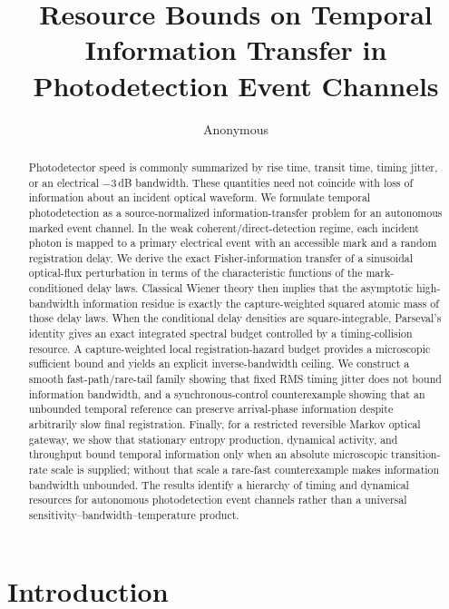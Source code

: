 \documentclass[aps,prapplied,preprint,nofootinbib]{revtex4-2}
\begin{document}
\title{Resource Bounds on Temporal Information Transfer in Photodetection Event Channels}

\author{Anonymous}

\begin{abstract}
Photodetector speed is commonly summarized by rise time, transit time, timing jitter, or an electrical $-3\,$dB bandwidth.  These quantities need not coincide with loss of information about an incident optical waveform.  We formulate temporal photodetection as a source-normalized information-transfer problem for an autonomous marked event channel.  In the weak coherent/direct-detection regime, each incident photon is mapped to a primary electrical event with an accessible mark and a random registration delay.  We derive the exact Fisher-information transfer of a sinusoidal optical-flux perturbation in terms of the characteristic functions of the mark-conditioned delay laws.  Classical Wiener theory then implies that the asymptotic high-bandwidth information residue is exactly the capture-weighted squared atomic mass of those delay laws.  When the conditional delay densities are square-integrable, Parseval's identity gives an exact integrated spectral budget controlled by a timing-collision resource.  A capture-weighted local registration-hazard budget provides a microscopic sufficient bound and yields an explicit inverse-bandwidth ceiling.  We construct a smooth fast-path/rare-tail family showing that fixed RMS timing jitter does not bound information bandwidth, and a synchronous-control counterexample showing that an unbounded temporal reference can preserve arrival-phase information despite arbitrarily slow final registration.  Finally, for a restricted reversible Markov optical gateway, we show that stationary entropy production, dynamical activity, and throughput bound temporal information only when an absolute microscopic transition-rate scale is supplied; without that scale a rare-fast counterexample makes information bandwidth unbounded.  The results identify a hierarchy of timing and dynamical resources for autonomous photodetection event channels rather than a universal sensitivity--bandwidth--temperature product.
\end{abstract}

\maketitle

\section{Introduction}
\end{document}

